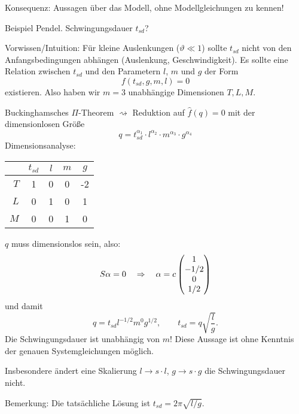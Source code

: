 Konsequenz: Aussagen über das Modell, ohne Modellgleichungen zu kennen!

Beispiel Pendel. Schwingungsdauer $t_{sd}$?

Vorwissen/Intuition: Für kleine Auslenkungen ($\vartheta \ll 1$) sollte $t_{sd}$
nicht von den Anfangsbedingungen abhängen (Auslenkung, Geschwindigkeit). Es
sollte eine Relation zwischen $t_{sd}$ und den Parametern $l$, $m$ und $g$ der
Form
\[ f( t_{sd}, g, m, l ) = 0 \]
existieren. Also haben wir $m=3$ unabhängige Dimensionen $T, L, M$.

Buckinghamsches $\Pi$-Theorem $\rightsquigarrow$ Reduktion auf $\hat{f}(q) = 0$
mit der dimensionlosen Größe
\[ q = t_{sd}^{\alpha_1} \cdot l^{\alpha_2} \cdot m^{\alpha_3} \cdot
  g^{\alpha_4} \]
Dimensionsanalyse:
\begin{center}
  \begin{tabular}{r|cccc}
    & $t_{sd}$ & $l$ & $m$ & $g$ \\
    \hline
    $T$ & 1 & 0 & 0 & -2 \\
    $L$ & 0 & 1 & 0 & 1 \\
    $M$ & 0 & 0 & 1 & 0
  \end{tabular}
\end{center}
$q$ muss dimensionslos sein, also:
\[ S\alpha = 0 \quad \Rightarrow \quad \alpha = c \begin{pmatrix}1 \\ -1/2 \\ 0 \\ 1/2 \end{pmatrix} \]
und damit
\[ q = t_{sd} l^{-1/2} m^0 g^{1/2}, \qquad t_{sd} = q \sqrt{\frac{l}{g}}. \]
Die Schwingungsdauer ist unabhängig von $m$! Diese Aussage ist ohne Kenntnis der
genauen Systemgleichungen möglich.

Insbesondere ändert eine Skalierung $l \to s \cdot l$, $g \to s \cdot g$ die
Schwingungsdauer nicht.

Bemerkung: Die tatsächliche Lösung ist $t_{sd} = 2 \pi \sqrt{l/g}$.

